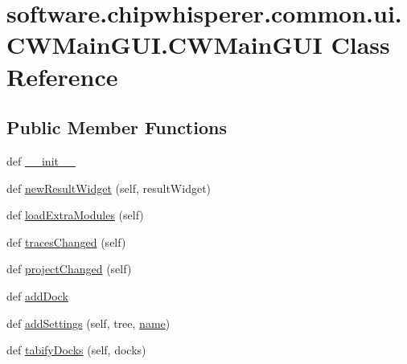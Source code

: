 \hypertarget{classsoftware_1_1chipwhisperer_1_1common_1_1ui_1_1CWMainGUI_1_1CWMainGUI}{}\section{software.\+chipwhisperer.\+common.\+ui.\+C\+W\+Main\+G\+U\+I.\+C\+W\+Main\+G\+U\+I Class Reference}
\label{classsoftware_1_1chipwhisperer_1_1common_1_1ui_1_1CWMainGUI_1_1CWMainGUI}
\subsection*{Public Member Functions}
\begin{DoxyCompactItemize}
\item 
def \hyperlink{classsoftware_1_1chipwhisperer_1_1common_1_1ui_1_1CWMainGUI_1_1CWMainGUI_aa53d1e7d0d4996aa50cd68b178b6e625}{\+\_\+\+\_\+init\+\_\+\+\_\+}
\item 
def \hyperlink{classsoftware_1_1chipwhisperer_1_1common_1_1ui_1_1CWMainGUI_1_1CWMainGUI_ac8ea41a3612cc87005bd939284715156}{new\+Result\+Widget} (self, result\+Widget)
\item 
def \hyperlink{classsoftware_1_1chipwhisperer_1_1common_1_1ui_1_1CWMainGUI_1_1CWMainGUI_a2fe8ecaf89d01dab7583cb893d9afa01}{load\+Extra\+Modules} (self)
\item 
def \hyperlink{classsoftware_1_1chipwhisperer_1_1common_1_1ui_1_1CWMainGUI_1_1CWMainGUI_af1248dec03438ea246c5be43fb255761}{traces\+Changed} (self)
\item 
def \hyperlink{classsoftware_1_1chipwhisperer_1_1common_1_1ui_1_1CWMainGUI_1_1CWMainGUI_ab760375f154c4cbfbeb55a1f84d4eee7}{project\+Changed} (self)
\item 
def \hyperlink{classsoftware_1_1chipwhisperer_1_1common_1_1ui_1_1CWMainGUI_1_1CWMainGUI_a2d8cacae035fbc590d4b5260246691ce}{add\+Dock}
\item 
def \hyperlink{classsoftware_1_1chipwhisperer_1_1common_1_1ui_1_1CWMainGUI_1_1CWMainGUI_a4914ce593a44851d86833a8c4e8e1b04}{add\+Settings} (self, tree, \hyperlink{classsoftware_1_1chipwhisperer_1_1common_1_1ui_1_1CWMainGUI_1_1CWMainGUI_a143ef09d088e7ef74ee8e681e3ed69c1}{name})
\item 
def \hyperlink{classsoftware_1_1chipwhisperer_1_1common_1_1ui_1_1CWMainGUI_1_1CWMainGUI_a97511de9ada9ad5e2b705ddd0ed35914}{tabify\+Docks} (self, docks)
\item 

\end{DoxyCompactItemize}

